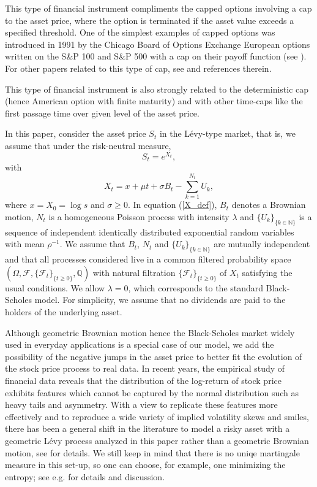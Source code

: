 \documentclass[10pt]{amsart}
\def\Q{{\mathbb{Q}}}
\def \F{{\mathcal{F}}}
\begin{document}
	This type of financial instrument compliments the capped options involving a cap to the asset price, where the option is terminated if the asset value exceeds a specified threshold.
	One of the simplest examples of capped options was introduced in 1991 by the Chicago Board of Options Exchange European options written on the S\&P 100 and S\&P 500 with a cap on their payoff function (see \cite{cap}).
	For other papers related to this type of cap, see \cite{Zaevski2, Zaevski2b} and references therein.
	
	This type of financial instrument is also strongly related to the deterministic cap (hence American option with finite maturity) and
	with other time-caps like the first passage time over given level of the asset price.
	
	In this paper, consider the asset price $S_t$ in the L\'evy-type market, that is, we assume that under the risk-neutral measure,
	\begin{equation*}
		S_t = e^{X_t},
	\end{equation*}
	with
	\begin{equation}\label{X_def}
		X_t = x + \mu t + \sigma B_t  - \sum_{k=1}^{N_t}U_k, %
	\end{equation}
	where $x = X_0 = \log s$ and $\sigma \geq 0$. In equation (\ref{X_def}), %
	$B_t$ denotes a Brownian motion, $N_t$ is a homogeneous Poisson process with intensity $\lambda$ and $\{U_k\}_{\{k\in \mathbb{N}\}}$ is a sequence of independent identically distributed exponential random variables with mean $\rho^{-1}$.
	We assume that $B_t$, $N_t$ and $\{U_k\}_{\{k\in \mathbb{N}\}}$ are mutually independent and that all processes considered live in a common filtered probability space $(\Omega, \F, \{\mathcal{F}_t\}_{\{t\geq 0\}}, \Q)$
	with natural filtration $\{\F_t\}_{\{t \geq 0\}}$ of $X_t$ satisfying the usual conditions. We allow $\lambda = 0$, which corresponds to the standard Black-Scholes model.
	For simplicity, we assume that no dividends are paid to the holders of the underlying asset.
	
	Although geometric Brownian motion hence the Black-Scholes market widely used in everyday applications is a special case of our model,
we add the possibility of the negative jumps in the asset price to better
fit the evolution of the stock price process to real data.
	In recent years, the empirical study of financial data reveals that the distribution
of the log-return of stock price exhibits features which cannot be captured by the normal
distribution such as heavy tails and asymmetry. With a view to replicate these features
more effectively and to reproduce a wide variety of implied volatility skews and smiles,
there has been a general shift in the literature to model a risky asset with a geometric
	L\'evy process analyzed in this paper rather than a geometric Brownian motion, see \cite{Schoutens} for details.
	We still keep in mind that there is no uniqe martingale measure in this set-up, so one can choose, for example, one minimizing the entropy; see e.g. \cite[Chap. 10.5]{Cont} for details and discussion.
	
\end{document}
